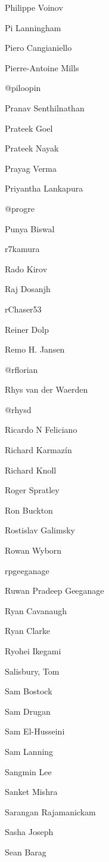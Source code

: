 \begin{DoxyItemize}
\item Philippe Voinov
\item Pi Lanningham
\item Piero Cangianiello
\item Pierre-\/\+Antoine Mills
\item @piloopin
\item Pranav Senthilnathan
\item Prateek Goel
\item Prateek Nayak
\item Prayag Verma
\item Priyantha Lankapura
\item @progre
\item Punya Biswal
\item r7kamura
\item Rado Kirov
\item Raj Dosanjh
\item r\+Chaser53
\item Reiner Dolp
\item Remo H. Jansen
\item @rflorian
\item Rhys van der Waerden
\item @rhysd
\item Ricardo N Feliciano
\item Richard Karmazín
\item Richard Knoll
\item Roger Spratley
\item Ron Buckton
\item Rostislav Galimsky
\item Rowan Wyborn
\item rpgeeganage
\item Ruwan Pradeep Geeganage
\item Ryan Cavanaugh
\item Ryan Clarke
\item Ryohei Ikegami
\item Salisbury, Tom
\item Sam Bostock
\item Sam Drugan
\item Sam El-\/\+Husseini
\item Sam Lanning
\item Sangmin Lee
\item Sanket Mishra
\item Sarangan Rajamanickam
\item Sasha Joseph
\item Sean Barag

\end{DoxyItemize}
